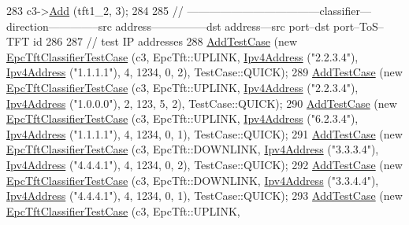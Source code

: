 \begin{DoxyCode}
283   c3->\hyperlink{classns3_1_1EpcTftClassifier_a4a0dd2623dd9bfbfb806183625af74bd}{Add} (tft1\_2, 3);
284 
285   \textcolor{comment}{// ------------------------------------classifier---direction--------------src address---------------dst
       address---src port--dst port--ToS--TFT id}
286 
287   \textcolor{comment}{// test IP addresses}
288   \hyperlink{classns3_1_1TestCase_a3718088e3eefd5d6454569d2e0ddd835}{AddTestCase} (\textcolor{keyword}{new} \hyperlink{classEpcTftClassifierTestCase}{EpcTftClassifierTestCase} (c3, EpcTft::UPLINK,   
      \hyperlink{classns3_1_1Ipv4Address}{Ipv4Address} (\textcolor{stringliteral}{"2.2.3.4"}), \hyperlink{classns3_1_1Ipv4Address}{Ipv4Address} (\textcolor{stringliteral}{"1.1.1.1"}),     4,     1234,     0,    2), 
      TestCase::QUICK);
289   \hyperlink{classns3_1_1TestCase_a3718088e3eefd5d6454569d2e0ddd835}{AddTestCase} (\textcolor{keyword}{new} \hyperlink{classEpcTftClassifierTestCase}{EpcTftClassifierTestCase} (c3, EpcTft::UPLINK,   
      \hyperlink{classns3_1_1Ipv4Address}{Ipv4Address} (\textcolor{stringliteral}{"2.2.3.4"}), \hyperlink{classns3_1_1Ipv4Address}{Ipv4Address} (\textcolor{stringliteral}{"1.0.0.0"}),     2,      123,     5,    2), 
      TestCase::QUICK);
290   \hyperlink{classns3_1_1TestCase_a3718088e3eefd5d6454569d2e0ddd835}{AddTestCase} (\textcolor{keyword}{new} \hyperlink{classEpcTftClassifierTestCase}{EpcTftClassifierTestCase} (c3, EpcTft::UPLINK,   
      \hyperlink{classns3_1_1Ipv4Address}{Ipv4Address} (\textcolor{stringliteral}{"6.2.3.4"}), \hyperlink{classns3_1_1Ipv4Address}{Ipv4Address} (\textcolor{stringliteral}{"1.1.1.1"}),     4,     1234,     0,    1), 
      TestCase::QUICK);
291   \hyperlink{classns3_1_1TestCase_a3718088e3eefd5d6454569d2e0ddd835}{AddTestCase} (\textcolor{keyword}{new} \hyperlink{classEpcTftClassifierTestCase}{EpcTftClassifierTestCase} (c3, EpcTft::DOWNLINK, 
      \hyperlink{classns3_1_1Ipv4Address}{Ipv4Address} (\textcolor{stringliteral}{"3.3.3.4"}), \hyperlink{classns3_1_1Ipv4Address}{Ipv4Address} (\textcolor{stringliteral}{"4.4.4.1"}),     4,     1234,     0,    2), 
      TestCase::QUICK);
292   \hyperlink{classns3_1_1TestCase_a3718088e3eefd5d6454569d2e0ddd835}{AddTestCase} (\textcolor{keyword}{new} \hyperlink{classEpcTftClassifierTestCase}{EpcTftClassifierTestCase} (c3, EpcTft::DOWNLINK, 
      \hyperlink{classns3_1_1Ipv4Address}{Ipv4Address} (\textcolor{stringliteral}{"3.3.4.4"}), \hyperlink{classns3_1_1Ipv4Address}{Ipv4Address} (\textcolor{stringliteral}{"4.4.4.1"}),     4,     1234,     0,    1), 
      TestCase::QUICK);
293   \hyperlink{classns3_1_1TestCase_a3718088e3eefd5d6454569d2e0ddd835}{AddTestCase} (\textcolor{keyword}{new} \hyperlink{classEpcTftClassifierTestCase}{EpcTftClassifierTestCase} (c3, EpcTft::UPLINK,   

\end{DoxyCode}
